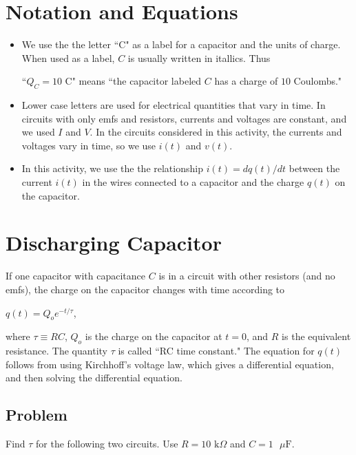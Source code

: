 \documentclass{article}
\begin{document}
\section{Notation and Equations}

\begin{itemize}

  \item We use the the letter ``C" as a label for a capacitor and the units of charge. When used as a label, $C$ is usually written in itallics. Thus

        ``$Q_C= 10 \text{ C}$" means ``the capacitor labeled $C$ has a charge of $10$ Coulombs."

  \item Lower case letters are used for electrical quantities that vary in time. In circuits with only emfs and resistors, currents and voltages are constant, and we used $I$ and $V$. In the circuits considered in this activity, the currents and voltages vary in time, so we use $i(t)$ and $v(t)$.

  \item In this activity, we use the the relationship $i(t)=dq(t)/dt$ between the current $i(t)$ in the wires connected to a capacitor and the charge $q(t)$ on the capacitor.

\end{itemize}

\section{Discharging Capacitor}

If one capacitor with capacitance $C$ is in a circuit with other resistors (and no emfs), the charge on the capacitor changes with time according to

$q(t)=Q_oe^{-t/\tau}$,

where $\tau\equiv RC$, $Q_o$ is the charge on the capacitor at $t=0$, and $R$ is the equivalent resistance. The quantity $\tau$ is called ``RC time constant." The equation for $q(t)$ follows from using Kirchhoff's voltage law, which gives a differential equation, and then solving the differential equation.

\subsection{Problem}

Find $\tau$ for the following two circuits. Use $R=10\text{ k}\Omega$ and $C=1\text{ }\mu\text{F}$.
\end{document}
